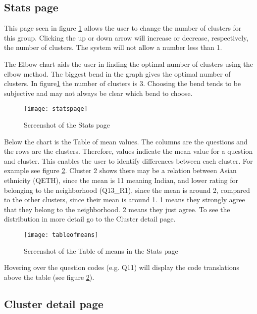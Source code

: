\subsection{Stats page}

This page seen in figure \ref{fig:statspage} allows the user to change the number of clusters for this group. Clicking the up or down arrow will increase or decrease, respectively, the number of clusters. The system will not allow a number less than 1.\par

The Elbow chart aids the user in finding the optimal number of clusters using the elbow method. The biggest bend in the graph gives the optimal number of clusters. In figure\ref{fig:statspage} the number of clusters is 3. Choosing the bend tends to be subjective and may not always be clear which bend to choose. \par

\begin{figure}[h]
\centering
\texttt{[image: statspage]}
\caption{Screenshot of the Stats page}
\label{fig:statspage}
\end{figure}

Below the chart is the Table of mean values. The columns are the questions and the rows are the clusters. Therefore, values indicate the mean value for a question and cluster. This enables the user to identify differences between each cluster. For example see figure \ref{fig:tableofmeans}. Cluster 2 shows there may be a relation between Asian ethnicity (QETH), since the mean is 11 meaning Indian, and lower rating for belonging to the neighborhood (Q13\_R1), since the mean is around 2, compared to the other clusters, since their mean is around 1. 1 means they strongly agree that they belong to the neighborhood. 2 means they just agree. To see the distribution in more detail go to the Cluster detail page.

\begin{figure}[h]
\centering
\texttt{[image: tableofmeans]}
\caption{Screenshot of the Table of means in the Stats page}
\label{fig:tableofmeans}
\end{figure}

Hovering over the question codes (e.g. Q11) will display the code translations above the table (see figure \ref{fig:tableofmeans}).

\subsection{Cluster detail page}

